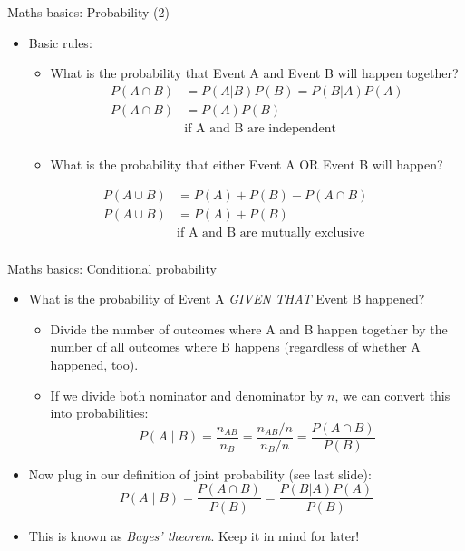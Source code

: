 \begin{frame}{Maths basics: Probability (2)}

\begin{itemize}
\itemsep1pt\parskip0pt
\item
  Basic rules:

  \begin{itemize}
  \item
    What is the probability that Event A and Event B will happen
    together? \[\begin{aligned}
    P(A\cap B) & = P(A|B)P(B) = P(B|A)P(A)\\
    P(A\cap B) &  = P(A)P(B) \qquad\\&\mbox{if A and B are independent}\\
    \end{aligned}\]
  \item
    What is the probability that either Event A OR Event B will happen?
  \end{itemize}
\end{itemize}

\[\begin{aligned}
P(A\cup B) & = P(A)+P(B)-P(A\cap B) \\
P(A\cup B) & = P(A)+P(B) \\\qquad&\mbox{if A and B are mutually exclusive} \\
\end{aligned}\]

\end{frame}

\begin{frame}{Maths basics: Conditional probability}

\begin{itemize}
\itemsep1pt\parskip0pt
\item
  What is the probability of Event A \emph{GIVEN THAT} Event B happened?

  \begin{itemize}
  \itemsep1pt\parskip0pt
  \item
    Divide the number of outcomes where A and B happen together by the
    number of all outcomes where B happens (regardless of whether A
    happened, too).
  \item
    If we divide both nominator and denominator by \(n\), we can convert
    this into probabilities:
    \[P(A \mid B) = \frac{n_{AB}}{n_B} = \frac{n_{AB}/n}{n_B/n} = \frac{P(A \cap B)}{P(B)}\]
  \end{itemize}
\item
  Now plug in our definition of joint probability (see last slide):
  \[P(A \mid B) = \frac{P(A \cap B)}{P(B)} = \frac{P(B|A)P(A)}{P(B)}\]
\item
  This is known as \emph{Bayes' theorem}. Keep it in mind for later!
\end{itemize}

\end{frame}

